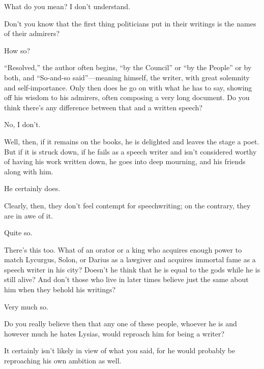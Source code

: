 \sayphaedrus What do you mean? I don't understand.

\saysocrates Don't you know that the first thing
politicians put in their
writings is the names
of their admirers?

\sayphaedrus How so?

\saysocrates “Resolved,” the author often begins, “by the Council” or “by
the People” or by both, and “So-and-so
said”---meaning
himself, the writer, with great solemnity and self-importance. Only then
does he go on with what he has to say, showing off his wisdom to his
admirers, often composing a very long document. Do you think there's any
difference between that and a written speech?

\sayphaedrus No, I don't.

\saysocrates Well, then, if it remains on the books, he is delighted and
leaves the stage a poet. But if it is struck down, if he fails as a
speech writer and isn't considered worthy of having his work written
down, he goes into deep mourning, and his friends along with him.

\sayphaedrus He certainly does.

\saysocrates Clearly, then, they don't feel contempt for speechwriting; on
the contrary, they are in awe of it.

\sayphaedrus Quite so.

\saysocrates There's this too. What of an orator or a king who acquires 
enough power to match Lycurgus, Solon, or Darius as a
lawgiver and acquires
immortal fame as a speech writer in his city? Doesn't he think that he
is equal to the gods while he is still alive? And don't those who live
in later times believe just the same about him when they behold his
writings?

\sayphaedrus Very much so.

\saysocrates Do you really believe then that any one of these people,
whoever he is and however much he hates Lysias, would reproach him for
being a writer?

\sayphaedrus It certainly isn't likely in view of what you said, for he
would probably be reproaching his own ambition as well.

